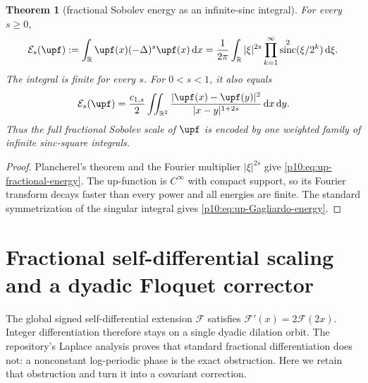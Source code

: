 \documentclass[11pt,oneside]{article}
\newtheorem{theorem}{Theorem}[section]
\theoremstyle{definition}
\theoremstyle{remark}
\newcommand{\R}{\mathbb R}
\newcommand{\dd}{\,\mathrm d}
\newcommand{\1}{\mathbf 1}
\DeclareMathOperator{\sinc}{sinc}
\begin{document}
\begin{theorem}[fractional Sobolev energy as an infinite-sinc integral]
\label{p10:thm:up-fractional-energy}
For every \(s\ge0\),
\begin{equation}\label{p10:eq:up-fractional-energy}
 \mathcal E_s(\upf)
 :=\int_{\R}\upf(x)(-\Delta)^s\upf(x)\dd x
 =\frac1{2\pi}\int_{\R}|\xi|^{2s}
  \prod_{k=1}^{\infty}\sinc^2(\xi/2^k)\dd\xi.
\end{equation}
The integral is finite for every \(s\).  For \(0<s<1\), it also equals
\begin{equation}\label{p10:eq:up-Gagliardo-energy}
 \mathcal E_s(\upf)
 =\frac{c_{1,s}}2\iint_{\R^2}
  \frac{|\upf(x)-\upf(y)|^2}{|x-y|^{1+2s}}\dd x\dd y.
\end{equation}
Thus the full fractional Sobolev scale of \(\upf\) is encoded by one weighted family
of infinite sinc-square integrals.
\end{theorem}

\begin{proof}
Plancherel's theorem and the Fourier multiplier \(|\xi|^{2s}\) give
\eqref{p10:eq:up-fractional-energy}.  The up-function is \(C^\infty\) with compact support,
so its Fourier transform decays faster than every power and all energies are finite.
The standard symmetrization of the singular integral gives
\eqref{p10:eq:up-Gagliardo-energy}.
\end{proof}

\section{Fractional self-differential scaling and a dyadic Floquet corrector}
\label{p10:sec:Floquet-fractional}

The global signed self-differential extension \(\mathcal F\) satisfies
\(\mathcal F'(x)=2\mathcal F(2x)\).  Integer differentiation therefore stays on a
single dyadic dilation orbit.  The repository's Laplace analysis proves that standard
fractional differentiation does not: a nonconstant log-periodic phase is the exact
obstruction.  Here we retain that obstruction and turn it into a covariant correction.
\end{document}
